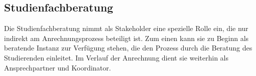 \subsection{Studienfachberatung}

Die Studienfachberatung nimmt als Stakeholder eine spezielle Rolle ein, die nur indirekt am Anrechnungsprozess beteiligt ist. Zum einen kann sie zu Beginn als beratende Instanz zur Verfügung stehen, die den Prozess durch die Beratung des Studierenden einleitet. 
Im Verlauf der Anrechnung dient sie weiterhin als Ansprechpartner und Koordinator.
